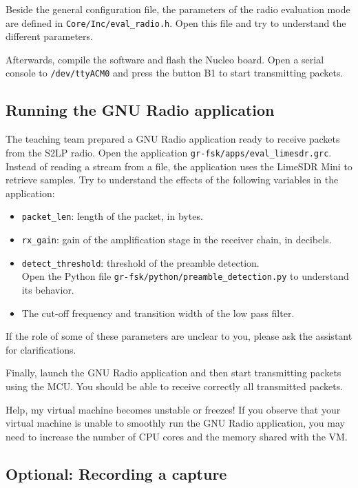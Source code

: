 Beside the general configuration file, the parameters of the radio evaluation mode are defined in \texttt{Core/Inc/eval\_radio.h}.
Open this file and try to understand the different parameters.

Afterwards, compile the software and flash the Nucleo board. Open a serial console to \texttt{/dev/ttyACM0} and press the button B1 to start
transmitting packets.

\subsection{Running the GNU Radio application}

The teaching team prepared a GNU Radio application ready to receive packets from the S2LP radio.
Open the application \texttt{gr-fsk/apps/eval\_limesdr.grc}. Instead of reading a stream from a file, the application uses the LimeSDR Mini
to retrieve samples. Try to understand the effects of the following variables in the application:
\begin{itemize}
    \item \texttt{packet\_len}: length of the packet, in bytes.
    \item \texttt{rx\_gain}: gain of the amplification stage in the receiver chain, in decibels.
    \item \texttt{detect\_threshold}: threshold of the preamble detection. \\
    Open the Python file \texttt{gr-fsk/python/preamble\_detection.py} to understand its behavior.
    \item The cut-off frequency and transition width of the low pass filter.
\end{itemize}
If the role of some of these parameters are unclear to you, please ask the assistant for clarifications.

Finally, launch the GNU Radio application and then start transmitting packets using the MCU. You should be able to receive correctly all transmitted packets.
\begin{bclogo}[couleur = gray!20, arrondi = 0.2, logo=\bcinfo]{Help, my virtual machine becomes unstable or freezes!}
    If you observe that your virtual machine is unable to smoothly run the GNU Radio application, you may need to increase the number
    of CPU cores and the memory shared with the VM.
\end{bclogo}

\subsection{Optional: Recording a capture}


